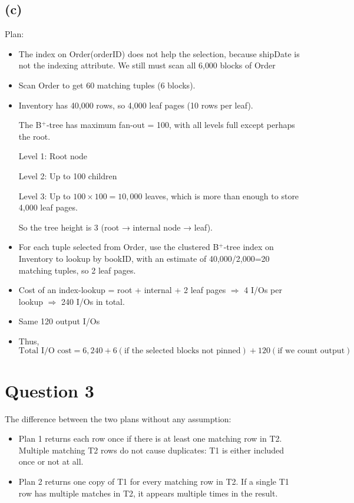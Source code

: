 \documentclass{article}
\begin{document}
\subsection*{(c)}
Plan:
\begin{itemize}
  \item The index on Order(orderID) does not help the selection, because shipDate is not the indexing attribute. We still must scan all 6{,}000 blocks of Order
  \item Scan Order to get 60 matching tuples (6 blocks).
  \item Inventory has 40,000 rows, so 4,000 leaf pages (10 rows per leaf).

        The B$^+$-tree has maximum fan-out = 100, with all levels full except perhaps the root.

        Level 1: Root node

        Level 2: Up to 100 children

        Level 3: Up to $100\times100=10,000$ leaves, which is more than enough to store 4,000 leaf pages.

        So the tree height is 3 (root → internal node → leaf).
  \item For each tuple selected from Order, use the clustered B$^+$-tree index on Inventory to lookup by bookID, with an estimate of 40{,}000/2{,}000=20 matching tuples, so 2 leaf pages.
  \item Cost of an index-lookup = root + internal + 2 leaf pages $\Rightarrow$ 4 I/Os per lookup $\Rightarrow$ 240 I/Os in total.
  \item Same 120 output I/Os
  \item Thus,
        $$
          \boxed{
            \text{Total I/O cost} = 6{,}240 + 6 (\text{if the selected blocks not pinned}) + 120(\text{if we count output})}
        $$
\end{itemize}

\newpage
\section*{Question 3}
The difference between the two plans without any assumption:
\begin{itemize}
  \item Plan 1 returns each row once if there is at least one matching row in T2. Multiple matching T2 rows do not cause duplicates: T1 is either included once or not at all.
  \item Plan 2 returns one copy of T1 for every matching row in T2. If a single T1 row has multiple matches in T2, it appears multiple times in the result.
\end{itemize}
\end{document}

